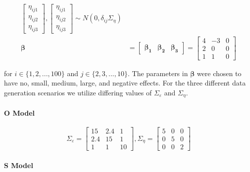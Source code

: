 \documentclass[
]{article}
\begin{document}
\begin{equation}
\begin{aligned}
\begin{bmatrix}
\eta_{ij1}\\
\eta_{ij2}\\
\eta_{ij3}
\end{bmatrix},
\begin{bmatrix}
\eta_{ij1}\\
\eta_{ij2}\\
\eta_{ij3}
\end{bmatrix} \sim N(0, \delta_{ij} \Sigma_\eta 
)\\
\boldsymbol{\beta} &= \begin{bmatrix} \boldsymbol{\beta_1} & \boldsymbol{\beta_2} &  \boldsymbol{\beta_3} \end{bmatrix} = 
\begin{bmatrix}
4 & -3 & 0\\
2 & 0 & 0\\
1 & 1 & 0
\end{bmatrix}
\end{aligned}
\end{equation}

for \(i \in \{1, 2, ..., 100\}\) and \(j \in \{2, 3,..., 10\}\). The parameters in \(\boldsymbol{\beta}\) were chosen to have no, small, medium, large, and negative effects. For the three different data generation scenarios we utilize differing values of \(\Sigma_\varepsilon\) and \(\Sigma_\eta\).

\hypertarget{o-model}{%
\paragraph{O Model}\label{o-model}}

\begin{equation}\label{eq:O}
\Sigma_\varepsilon = 
\begin{bmatrix}
15 & 2.4 & 1\\
2.4 & 15 & 1\\
1 & 1 & 10
\end{bmatrix},
\Sigma_\eta =
\begin{bmatrix}
5 & 0 & 0\\
0 & 5 & 0\\
0 & 0 & 2
\end{bmatrix}
\end{equation}

\hypertarget{s-model}{%
\paragraph{S Model}\label{s-model}}
\end{document}
